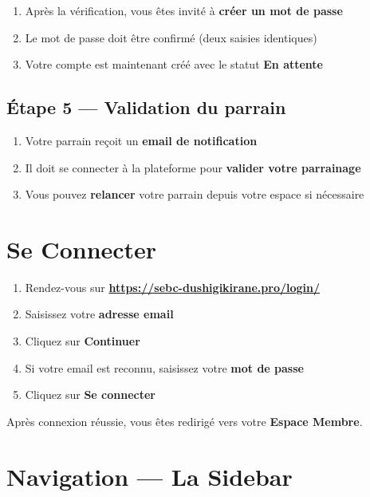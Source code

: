 \documentclass[12pt,a4paper]{article}
\begin{document}
\begin{enumerate}
    \item Après la vérification, vous êtes invité à \textbf{créer un mot de passe}
    \item Le mot de passe doit être confirmé (deux saisies identiques)
    \item Votre compte est maintenant créé avec le statut \textbf{En attente}
\end{enumerate}

\subsection{Étape 5 — Validation du parrain}

\begin{enumerate}
    \item Votre parrain reçoit un \textbf{email de notification}
    \item Il doit se connecter à la plateforme pour \textbf{valider votre parrainage}
    \item Vous pouvez \textbf{relancer} votre parrain depuis votre espace si nécessaire
\end{enumerate}

\section{Se Connecter}

\begin{etapebox}
\begin{enumerate}[leftmargin=1.5em]
    \item Rendez-vous sur \textbf{\url{https://sebc-dushigikirane.pro/login/}}
    \item Saisissez votre \textbf{adresse email}
    \item Cliquez sur \textbf{Continuer}
    \item Si votre email est reconnu, saisissez votre \textbf{mot de passe}
    \item Cliquez sur \textbf{Se connecter}
\end{enumerate}
\end{etapebox}

Après connexion réussie, vous êtes redirigé vers votre \textbf{Espace Membre}.

\section{Navigation — La Sidebar}
\end{document}
